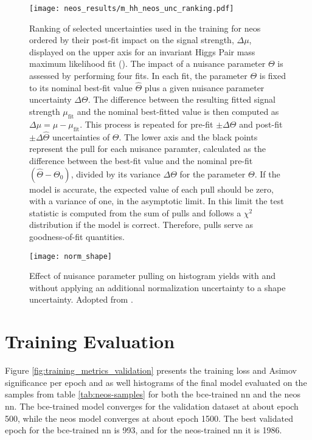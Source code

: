 \begin{figure}
    \centering
    \texttt{[image: neos\_results/m\_hh\_neos\_unc\_ranking.pdf]}
    \caption[]{Ranking of selected uncertainties used in the training for \ac{neos} ordered by their post-fit impact on the signal strength, $\Delta\mu$, displayed on the upper axis for an invariant Higgs Pair mass maximum likelihood fit (\mhh{}). The impact of a nuisance parameter $\Theta$ is assessed by performing four fits. In each fit, the parameter $\Theta$ is fixed to its nominal best-fit value $\hat{\Theta}$ plus a given nuisance parameter uncertainty $\Delta\Theta$. The difference between the resulting fitted signal strength $\mu_\text{fit}$ and the nominal best-fitted value is then computed as $\Delta\mu=\hat{\mu} - \mu_\text{fit}$. This process is repeated for pre-fit $\pm\Delta\Theta$ and post-fit $\pm\Delta\hat{\Theta}$ uncertainties of $\Theta$. The lower axis and the black points represent the pull for each nuisance paramter, calculated as the difference between the best-fit value and the nominal pre-fit $(\hat{\Theta} - \Theta_0)$, divided by its variance $\Delta\Theta$ for the parameter $\Theta$. If the model is accurate, the expected value of each pull should be zero, with a variance of one, in the asymptotic limit. In this limit the test statistic is computed from the sum of pulls and follows a $\chi^2$ distribution if the model is correct. Therefore, pulls serve as goodness-of-fit quantities. }
    \label{fig:m_hh_neos_unc_ranking}
\end{figure}


\begin{figure}
    \centering
    \texttt{[image: norm\_shape]}
    \caption[]{Effect of nuisance parameter pulling on histogram yields with and without applying an additional normalization uncertainty to a shape uncertainty. Adopted from \citep{held_stat_intro}.}
    \label{fig:norm_shape}
\end{figure}



\section{Training Evaluation}
Figure \ref{fig:training_metrics_validation} presents the training loss and Asimov significance per epoch and as well histograms of the final model evaluated on the samples from table \ref{tab:neos-samples} for both the \ac{bce}-trained \ac{nn} and the neos \ac{nn}. The \ac{bce}-trained model converges for the validation dataset at about epoch 500, while the \ac{neos} model converges at about epoch 1500. The best validated epoch for the \ac{bce}-trained \ac{nn} is 993, and for the \ac{neos}-trained \ac{nn} it is 1986.


